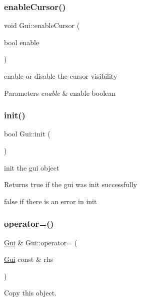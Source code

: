 \subsubsection{\texorpdfstring{enable\+Cursor()}{enableCursor()}}
{\footnotesize\ttfamily void Gui\+::enable\+Cursor (\begin{DoxyParamCaption}\item[{bool}]{enable }\end{DoxyParamCaption})}



enable or disable the cursor visibility 


\begin{DoxyParams}{Parameters}
{\em enable} & enable boolean \\
\hline
\end{DoxyParams}
\mbox{\label{class_gui_a735bdb412232cf6980819e21f1dbdb66}} 
\subsubsection{\texorpdfstring{init()}{init()}}
{\footnotesize\ttfamily bool Gui\+::init (\begin{DoxyParamCaption}{ }\end{DoxyParamCaption})}



init the gui object 

\begin{DoxyReturn}{Returns}
true if the gui was init successfully 

false if there is an error in init 
\end{DoxyReturn}
\mbox{\label{class_gui_ac260d502b2a5440591c3e4e4520acf94}} 
\subsubsection{\texorpdfstring{operator=()}{operator=()}}
{\footnotesize\ttfamily \hyperlink{class_gui}{Gui} \& Gui\+::operator= (\begin{DoxyParamCaption}\item[{\hyperlink{class_gui}{Gui} const \&}]{rhs }\end{DoxyParamCaption})}



Copy this object. 



